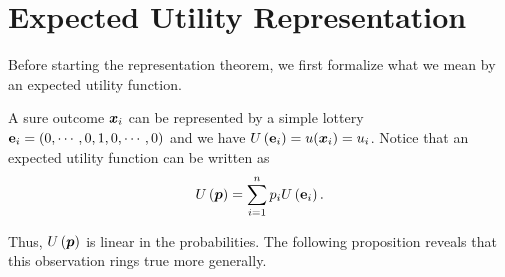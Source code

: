 \section{Expected Utility Representation}\label{expected-utility-representation}

Before starting the representation theorem, we first formalize what we
mean by an expected utility function.


A sure outcome \(\bm x_i\) can be represented by a simple lottery \(\textbf e_i = \left(0,\cdots ,0,1,0,\cdots, 0\right)\) and we have
\(U\left(\textbf e_i\right) = u(\bm x_i) = u_i\). Notice that an expected utility function can be written as
\[U\left(\bm p\right) = \sum_{i = 1}^n p_iU\left(\textbf e_i\right).\]

Thus, $U\left(\bm p\right)$ is linear in the probabilities. The following proposition reveals that this observation rings true more generally.

